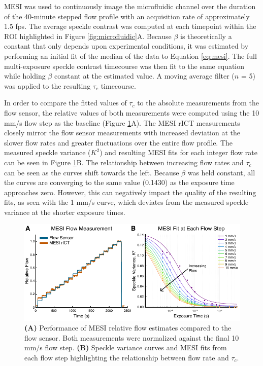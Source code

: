 MESI was used to continuously image the microfluidic channel over the duration of the 40-minute stepped flow profile with an acquisition rate of approximately 1.5 fps. The average speckle contrast was computed at each timepoint within the ROI highlighted in Figure \ref{fig:microfluidic}A. Because $\beta$ is theoretically a constant that only depends upon experimental conditions, it was estimated by performing an initial fit of the median of the data to Equation \ref{eq:mesi}. The full multi-exposure speckle contrast timecourse was then fit to the same equation while holding $\beta$ constant at the estimated value. A moving average filter ($n$ = 5) was applied to the resulting $\tau_c$ timecourse.

In order to compare the fitted values of $\tau_c$ to the absolute measurements from the flow sensor, the relative values of both measurements were computed using the 10 mm/s flow step as the baseline (Figure \ref{fig:microfluidicrelativeflow}A). The MESI rICT measurements closely mirror the flow sensor measurements with increased deviation at the slower flow rates and greater fluctuations over the entire flow profile. The measured speckle variance ($K^2$) and resulting MESI fits for each integer flow rate can be seen in Figure \ref{fig:microfluidicrelativeflow}B. The relationship between increasing flow rates and $\tau_c$ can be seen as the curves shift towards the left. Because $\beta$ was held constant, all the curves are converging to the same value (0.1430) as the exposure time approaches zero. However, this can negatively impact the quality of the resulting fits, as seen with the 1 mm/s curve, which deviates from the measured speckle variance at the shorter exposure times.

\begin{figure}
    \includegraphics{figures/chapter_4/microfluidicrelativeflow.pdf}
    \caption{
        \label{fig:microfluidicrelativeflow}
        \textbf{(A)} Performance of MESI relative flow estimates compared to the flow sensor. Both measurements were normalized against the final 10 mm/s flow step. \textbf{(B)} Speckle variance curves and MESI fits from each flow step highlighting the relationship between flow rate and $\tau_c$.
    }
\end{figure}

